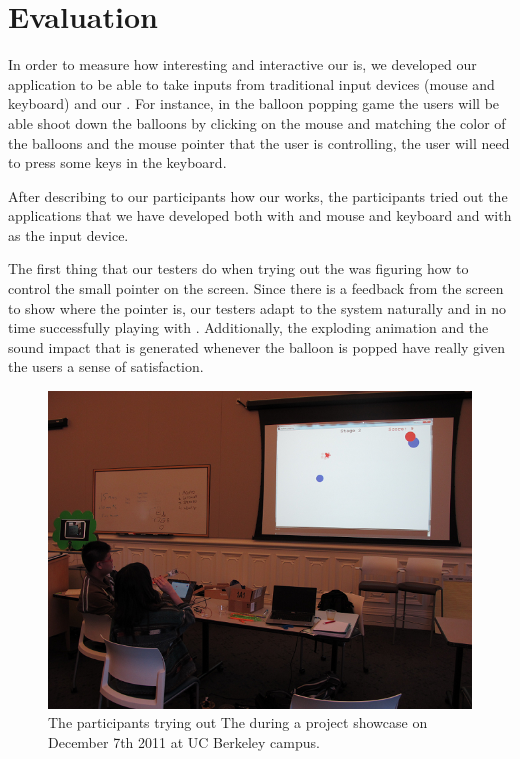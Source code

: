 \section{Evaluation}\label{sec:eval}

In order to measure how interesting and interactive our \tube is, we developed our application to be able to take inputs from traditional input devices (\ie mouse and keyboard) and our \tube. For instance, in the balloon popping game the users will be able shoot down the balloons by clicking on the mouse and matching the color of the balloons and the mouse pointer that the user is controlling, the user will need to press some keys in the keyboard.

After describing to our participants how our \tube works, the participants tried out the applications that we have developed both with and mouse and keyboard and with \tube as the input device.


The first thing that our testers do when trying out the \tube was figuring how to control the small pointer on the screen. Since there is a feedback from the screen to show where the pointer is, our testers adapt to the system naturally and in no time successfully playing with \tube. Additionally, the exploding animation and the sound impact that is generated whenever the balloon is popped have really given the users a sense of satisfaction.

\begin{figure}
  \centering
  \includegraphics[width=\linewidth]{./figs/impl2.png}
  \caption{The participants trying out The \tube during a project showcase on December 7th 2011 at UC Berkeley campus.}
  \label{fig:impl2}
\end{figure}


